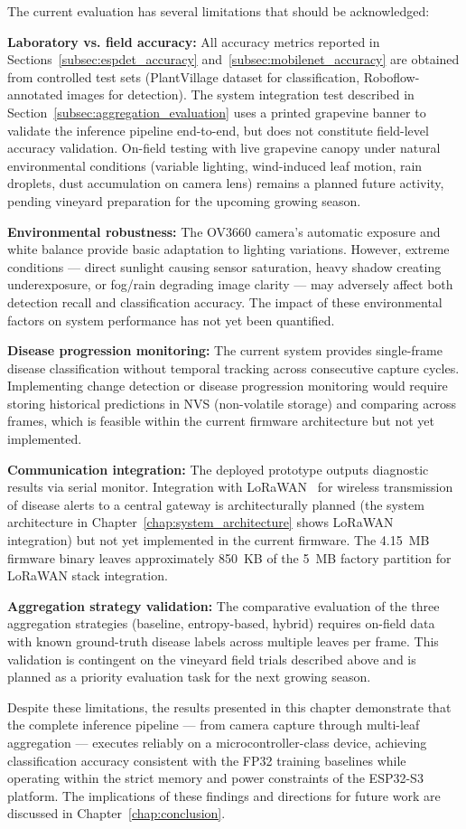 The current evaluation has several limitations that should be acknowledged:

\textbf{Laboratory vs. field accuracy:} All accuracy metrics reported in Sections~\ref{subsec:espdet_accuracy} and~\ref{subsec:mobilenet_accuracy} are obtained from controlled test sets (PlantVillage dataset for classification, Roboflow-annotated images for detection). The system integration test described in Section~\ref{subsec:aggregation_evaluation} uses a printed grapevine banner to validate the inference pipeline end-to-end, but does not constitute field-level accuracy validation. On-field testing with live grapevine canopy under natural environmental conditions (variable lighting, wind-induced leaf motion, rain droplets, dust accumulation on camera lens) remains a planned future activity, pending vineyard preparation for the upcoming growing season.

\textbf{Environmental robustness:} The OV3660 camera's automatic exposure and white balance provide basic adaptation to lighting variations. However, extreme conditions --- direct sunlight causing sensor saturation, heavy shadow creating underexposure, or fog/rain degrading image clarity --- may adversely affect both detection recall and classification accuracy. The impact of these environmental factors on system performance has not yet been quantified.

\textbf{Disease progression monitoring:} The current system provides single-frame disease classification without temporal tracking across consecutive capture cycles. Implementing change detection or disease progression monitoring would require storing historical predictions in NVS (non-volatile storage) and comparing across frames, which is feasible within the current firmware architecture but not yet implemented.

\textbf{Communication integration:} The deployed prototype outputs diagnostic results via serial monitor. Integration with LoRaWAN~\cite{adelantado2017understanding} for wireless transmission of disease alerts to a central gateway is architecturally planned (the system architecture in Chapter~\ref{chap:system_architecture} shows LoRaWAN integration) but not yet implemented in the current firmware. The 4.15~MB firmware binary leaves approximately 850~KB of the 5~MB factory partition for LoRaWAN stack integration.

\textbf{Aggregation strategy validation:} The comparative evaluation of the three aggregation strategies (baseline, entropy-based, hybrid) requires on-field data with known ground-truth disease labels across multiple leaves per frame. This validation is contingent on the vineyard field trials described above and is planned as a priority evaluation task for the next growing season.

Despite these limitations, the results presented in this chapter demonstrate that the complete inference pipeline --- from camera capture through multi-leaf aggregation --- executes reliably on a microcontroller-class device, achieving classification accuracy consistent with the FP32 training baselines while operating within the strict memory and power constraints of the ESP32-S3 platform. The implications of these findings and directions for future work are discussed in Chapter~\ref{chap:conclusion}.
